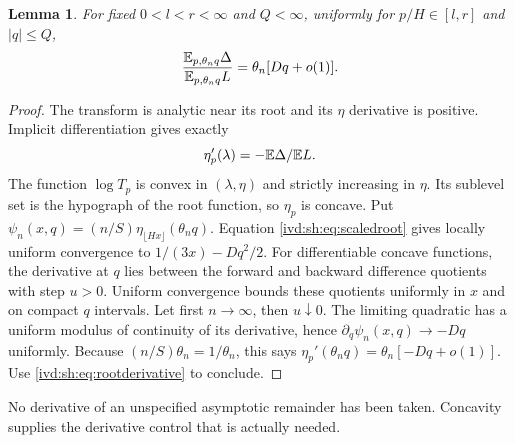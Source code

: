 \documentclass[11pt,letterpaper]{article}
\newtheorem{lemma}[theorem]{Lemma}
\theoremstyle{remark}\newtheorem{remark}[theorem]{Remark}
\numberwithin{equation}{section}
\begin{document}
\begin{lemma}\label{ivd:sh:lem:drift}
For fixed $0<l<r<\infty$ and $Q<\infty$, uniformly for
$p/H\in[l,r]$ and $|q|\le Q$,
\begin{equation}\label{ivd:sh:eq:drift}
 \frac{\mathbb E_{p,\theta_n q}\Delta}{\mathbb E_{p,\theta_n q}L}
  =\theta_n[Dq+o(1)].
\end{equation}
\end{lemma}
\begin{proof}
The transform is analytic near its root and its $\eta$ derivative is
positive. Implicit differentiation gives exactly
\begin{equation}\label{ivd:sh:eq:rootderivative}
 \eta_p'(\lambda)=-\mathbb E\Delta/\mathbb E L.
\end{equation}
The function $\log T_p$ is convex in $(\lambda,\eta)$ and strictly
increasing in $\eta$. Its sublevel set is the hypograph of the root
function, so $\eta_p$ is concave. Put
$\psi_n(x,q)=(n/S)\eta_{\lfloor Hx\rfloor}(\theta_n q)$.
Equation \eqref{ivd:sh:eq:scaledroot} gives locally uniform convergence to
$1/(3x)-Dq^2/2$. For differentiable concave functions, the derivative
at $q$ lies between the forward and backward difference quotients
with step $u>0$. Uniform convergence bounds these quotients uniformly
in $x$ and on compact $q$ intervals. Let first $n\to\infty$, then
$u\downarrow0$. The limiting quadratic has a uniform modulus of
continuity of its derivative, hence
$\partial_q\psi_n(x,q)\to-Dq$ uniformly.
Because $(n/S)\theta_n=1/\theta_n$, this says
$\eta_p'(\theta_n q)=\theta_n[-Dq+o(1)]$.
Use \eqref{ivd:sh:eq:rootderivative} to conclude.
\end{proof}
No derivative of an unspecified asymptotic remainder has been taken.
Concavity supplies the derivative control that is actually needed.
\end{document}
